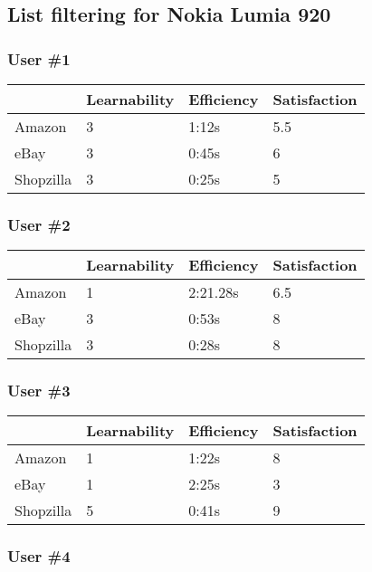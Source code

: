 \documentclass[11pt, oneside]{article}   	%
\begin{document}
\subsection{List filtering for Nokia Lumia 920}

\subsubsection{User \#1}

\begin{tabular}{| l | l | l | l |}
    \hline
     & Learnability & Efficiency & Satisfaction \\ \hline
    Amazon & 3 & 1:12s & 5.5 \\ \hline
    eBay & 3 & 0:45s & 6 \\ \hline
    Shopzilla & 3 & 0:25s & 5 \\\hline
\end{tabular}

\subsubsection{User \#2}

\begin{tabular}{| l | l | l | l |}
    \hline
     & Learnability & Efficiency & Satisfaction \\ \hline
    Amazon & 1 & 2:21.28s & 6.5 \\ \hline
    eBay & 3 & 0:53s & 8 \\ \hline
    Shopzilla & 3 & 0:28s & 8 \\\hline
\end{tabular}

\subsubsection{User \#3}

\begin{tabular}{| l | l | l | l |}
    \hline
     & Learnability & Efficiency & Satisfaction \\ \hline
    Amazon & 1 & 1:22s & 8 \\ \hline
    eBay & 1 & 2:25s & 3 \\ \hline
    Shopzilla & 5 & 0:41s & 9 \\\hline
\end{tabular}

\subsubsection{User \#4}
\end{document}
